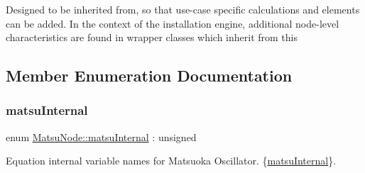 Designed to be inherited from, so that use-\/case specific calculations and elements can be added. In the context of the installation engine, additional node-\/level characteristics are found in wrapper classes which inherit from this 

\subsection{Member Enumeration Documentation}
\mbox{\label{classMatsuNode_a5899aeb63b46cd45b1dc825ad518289a}} 
\subsubsection{\texorpdfstring{matsu\+Internal}{matsuInternal}}
{\footnotesize\ttfamily enum \mbox{\hyperlink{classMatsuNode_a5899aeb63b46cd45b1dc825ad518289a}{Matsu\+Node\+::matsu\+Internal}} \+: unsigned\hspace{0.3cm}{\ttfamily [strong]}}



Equation internal variable names for Matsuoka Oscillator. \{\mbox{\hyperlink{classMatsuNode_a5899aeb63b46cd45b1dc825ad518289a}{matsu\+Internal}}\}. 

